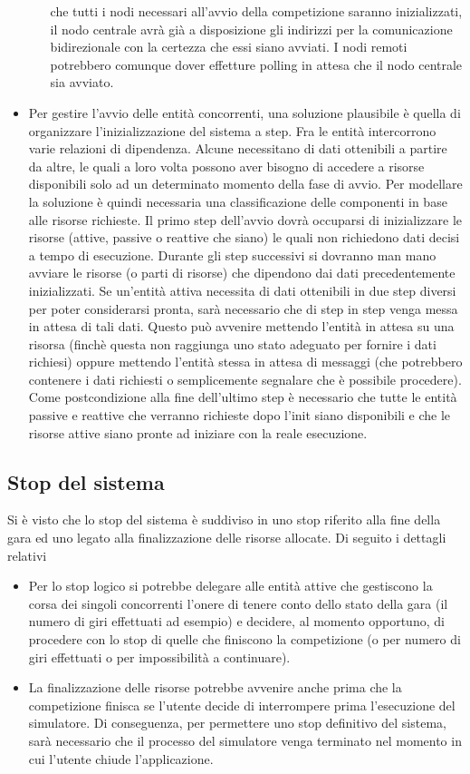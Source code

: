 \begin{itemize}
\begin{itemize}
che tutti i nodi necessari all'avvio della competizione saranno inizializzati, il nodo centrale avrà già a disposizione gli indirizzi per la comunicazione
bidirezionale con la certezza che essi siano avviati. I nodi remoti potrebbero comunque dover effetture polling in attesa che il nodo centrale sia avviato.
\end{itemize}
\item Per gestire l'avvio delle entità concorrenti, una soluzione plausibile è quella di organizzare l'inizializzazione del sistema a step.
Fra le entità intercorrono varie relazioni di dipendenza. Alcune necessitano di dati ottenibili a partire da altre, le quali a loro volta
possono aver bisogno di accedere a risorse disponibili solo ad un determinato momento della fase di avvio. Per modellare la soluzione
è quindi necessaria una classificazione delle componenti in base alle risorse richieste. Il primo step dell'avvio dovrà occuparsi di inizializzare
le risorse (attive, passive o reattive che siano) le quali non richiedono dati decisi a tempo di esecuzione. Durante gli step successivi
si dovranno man mano avviare le risorse (o parti di risorse) che dipendono dai dati precedentemente inizializzati. Se un'entità attiva necessita
di dati ottenibili in due step diversi per poter considerarsi pronta, sarà necessario che di step in step venga messa in attesa di tali dati.
Questo può avvenire mettendo l'entità in attesa su una risorsa (finchè questa non raggiunga uno stato adeguato per fornire i dati richiesi)
oppure mettendo l'entità stessa in attesa di messaggi (che potrebbero contenere i dati richiesti o semplicemente segnalare che è possibile
procedere). Come postcondizione alla fine dell'ultimo step è necessario che tutte le entità passive e reattive che verranno richieste dopo l'init
siano disponibili e che le risorse attive siano pronte ad iniziare con la reale esecuzione.
\end{itemize}
\subsection{Stop del sistema}
Si è visto che lo stop del sistema è suddiviso in uno stop riferito alla fine della gara ed uno legato alla finalizzazione delle risorse allocate.
Di seguito i dettagli relativi 
\begin{itemize}
\item Per lo stop logico si potrebbe delegare alle entità attive che gestiscono la corsa dei singoli concorrenti l'onere di tenere conto 
dello stato della gara (il numero di giri effettuati ad esempio) e decidere, al momento opportuno, di procedere con lo stop di quelle che
finiscono la competizione (o per numero di giri effettuati o per impossibilità a continuare).
\item La finalizzazione delle risorse potrebbe avvenire anche prima che la competizione finisca se l'utente decide di interrompere prima
l'esecuzione del simulatore. Di conseguenza, per permettere uno stop definitivo del sistema, sarà necessario che il processo del simulatore
venga terminato nel momento in cui l'utente chiude l'applicazione.
\end{itemize}